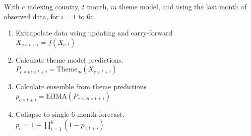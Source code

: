 \documentclass[tightpage]{standalone}
\begin{document}
\begin{varwidth}{\linewidth}

\begin{mdframed}[linewidth=1,linecolor=black!50]
\raggedright
With $c$ indexing country, $t$ month, $m$ theme model, and using the last month of observed data, for  $i = 1$ to $6$:
\vspace{-5pt}
\begin{enumerate}
\setlength{\itemsep}{-4pt}
\item Extrapolate data using updating and carry-forward \\
$X_{c \times t+i} = f(X_{c, t})$ 
\item Calculate theme model predictions. \\
$P_{c \times m \times t+i} = \textrm{Theme}_m(X_{c \times t+i})$
\item Calculate ensemble from theme predictions \\
$p_{c \times t+i} = \textrm{EBMA}(P_{c \times m \times t+i})$
\item Collapse to single 6-month forecast. \\ $p_c = 1 - \prod_{i=1}^6(1 - p_{c, t+i})$
\end{enumerate}
\end{mdframed}

\end{varwidth}
\end{document}
